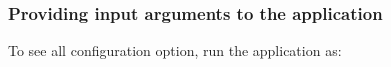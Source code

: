 \documentclass[letterpaper,10pt,english]{sphinxmanual}
\begin{document}
\subsubsection{Providing input arguments to the  application}
\label{\detokenize{Simulation/SimulationCodeDoc:providing-input-arguments-to-the-hepemshow-application}}
\sphinxAtStartPar
To see all configuration option, run the application as:

\begin{sphinxVerbatim}[commandchars=\\\{\}]
 

   \PYG{p}{[}\PYG{p}{]}


\end{sphinxVerbatim}
\end{document}
